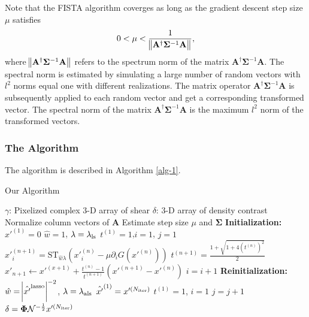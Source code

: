 \documentclass[twocolumn]{aastex62}
\begin{document}
Note that the FISTA algorithm coverges as long as the gradient descent step size $\mu$ satisfies
\begin{equation}
 0< \mu < \frac{1}{ \norm{\mathbf{A^{\dagger}} \mathbf{\Sigma}^{-1} \mathbf{A} }},
\end{equation}
where $\norm{\mathbf{A^{\dagger}} \mathbf{\Sigma}^{-1} \mathbf{A} }$ refers to the spectrum norm of the matrix
$\mathbf{A^{\dagger}} \mathbf{\Sigma}^{-1} \mathbf{A}$. The spectral norm is estimated by simulating a large number of
random vectors with $l^2$ norms equal one with different realizations. The matrix operator 
$\mathbf{A^{\dagger}} \mathbf{\Sigma}^{-1} \mathbf{A}$ is subsequently applied to each random vector and get a corresponding 
transformed vector. The spectral norm of the matrix $\mathbf{A^{\dagger}} \mathbf{\Sigma}^{-1} \mathbf{A}$ is the maximum $l^2$ 
norm of the transformed vectors.

\subsubsection{The Algorithm}

The algorithm is described in Algorithm \ref{alg-1}.

\begin{algorithm}[H]
\renewcommand{\thealgorithm}{}
\label{alg-1}
\caption{Our Algorithm}
\begin{algorithmic}[1]
\INPUT $\gamma$: Pixelized complex $3$-D array of shear
\OUTPUT  $\delta$: $3$-D array of density contrast
\STATE Normalize column vectors of $\mathbf{A}$
\STATE Estimate step size $\mu$ and $\mathbf{\Sigma}$
\STATE \textbf{Initialization:}
\STATE $x'^{(1)} = 0$
\STATE $\hat{w}=1$, $\lambda=\lambda_{\rm{ls}}$
\STATE $t^{(1)}=1$,$i=1$, $j=1$
        \STATE $x'^{(n+1)}_{i}=\mathrm{ST}_{\hat{w}\lambda} \left(x'^{(n)}_{i} -\mu \partial_i G(x'^{(n)})\right)$
        \STATE $t^{(n+1)}=\frac{1+\sqrt{1+4(t^{(n)})^2}}{2}$
        \STATE $x'_{n+1} \leftarrow x'^{(x+1)}+ \frac{t^{(n)}-1}{t^{(n+1)}}(x'^{(n+1)}-x'^{(n)})$
        \STATE $i=i+1$
    \ENDWHILE
\STATE \textbf{Reinitialization:}
\STATE $\hat{w}=\abs{\hat{x'}^{\rm{lasso}}}^{-2}$, $\lambda=\lambda_{\rm{als}}$
\STATE $\hat{x'}^{(1)} = x'^{(N_{\rm{iter}})}$
\STATE $t^{(1)}=1$, $i=1$
\STATE $j=j+1$
\ENDWHILE
\STATE $\delta=\mathbf{\Phi}\mathcal{N}^{-\frac{1}{2}}x'^{(N_{\rm{iter}})}$
\end{algorithmic}
\end{algorithm}
\end{document}
